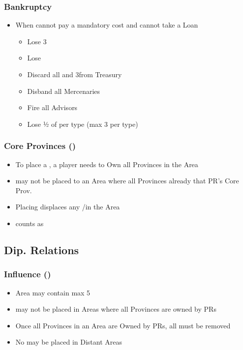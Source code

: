 \documentclass[10pt]{article}
\begin{document}
\subsubsection*{Bankruptcy}
\begin{itemize}
	\item When cannot pay a mandatory cost and cannot take a Loan
	\begin{itemize}
		\item Lose 3\stability
		\item Lose 
		\item Discard all \ducats and 3\interest from Treasury
		\item Disband all Mercenaries
		\item Fire all Advisors
		\item Lose ½ of \monarchpower per type (max 3 per type)
	\end{itemize}
\end{itemize}

\subsubsection*{Core Provinces (\core)}
\begin{itemize}
	\item To place a \core, a player needs to Own all Provinces in the Area
	\item \core may not be placed to an Area where all Provinces already that PR's Core Prov.
	\item Placing \core displaces any \core/\dnpr in the Area
	\item \core counts as \claim
\end{itemize}

\subsection*{Dip. Relations }
\subsubsection*{Influence (\influence)}
\begin{itemize}
	\item Area may contain max 5 \influence
	\item \influence may not be placed in Areas where all Provinces are owned by PRs
	\item Once all Provinces in an Area are Owned by PRs, all \influence must be removed
	\item No \influence may be placed in Distant Areas
\end{itemize}
\end{document}
